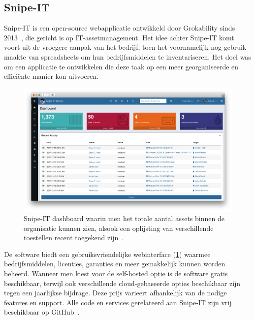 \subsection{Snipe-IT}
\label{sub:snipe-it}

Snipe-IT is een open-source webapplicatie ontwikkeld door Grokability sinds 2013~\autocite{snipe-it-introduction}, die gericht is op IT-assetmanagement.
Het idee achter Snipe-IT komt voort uit de vroegere aanpak van het bedrijf, toen het voornamelijk nog gebruik maakte van spreadsheets om hun bedrijfsmiddelen te inventariseren.
Het doel was om een applicatie te ontwikkelen die deze taak op een meer georganiseerde en effici\"ente manier kon uitvoeren.

\begin{figure}[h!]
    \includegraphics[width=\textwidth]
    {./graphics/state-of-the-art/snipe-dashboard.png}
    \caption[Snipe-IT dashboard voor assets.]{\label{fig:snipe-it-dashboard}Snipe-IT dashboard waarin men het totale aantal assets binnen de organisatie kunnen zien, alsook een oplijsting van verschillende toestellen recent toegekend zijn~\autocite{snipe-it-dashboard}.}
\end{figure}

De software biedt een gebruiksvriendelijke webinterface (\ref{fig:snipe-it-dashboard}) waarmee bedrijfsmiddelen, licenties, garanties en meer gemakkelijk kunnen worden beheerd.
Wanneer men kiest voor de self-hosted optie is de software gratis beschikbaar, terwijl ook verschillende cloud-gebaseerde opties beschikbaar zijn tegen een jaarlijkse bijdrage.
Deze prijs varieert afhankelijk van de nodige features en support.
Alle code en services gerelateerd aan Snipe-IT zijn vrij beschikbaar op GitHub~\autocite{snipe-it-github}.

